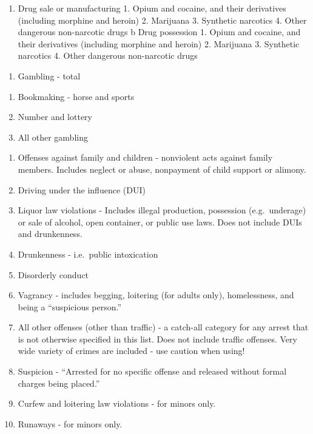 \documentclass[
]{krantz}
\providecommand{\tightlist}{%
  \setlength{\itemsep}{0pt}\setlength{\parskip}{0pt}}
\begin{document}
\begin{enumerate}
\def\labelenumi{\alph{enumi}.}
\tightlist
\item
  Drug sale or manufacturing 1. Opium and cocaine, and their
  derivatives (including morphine and heroin) 2. Marijuana
  3. Synthetic narcotics 4. Other dangerous non-narcotic
  drugs b Drug possession 1. Opium and cocaine, and their
  derivatives (including morphine and heroin) 2. Marijuana
  3. Synthetic narcotics 4. Other dangerous non-narcotic
  drugs
\end{enumerate}

\begin{enumerate}
\def\labelenumi{\arabic{enumi}.}
\setcounter{enumi}{18}
\tightlist
\item
  Gambling - total
\end{enumerate}

\begin{enumerate}
\def\labelenumi{\alph{enumi}.}
\tightlist
\item
  Bookmaking - horse and sports
\item
  Number and lottery
\item
  All other gambling
\end{enumerate}

\begin{enumerate}
\def\labelenumi{\arabic{enumi}.}
\setcounter{enumi}{19}
\tightlist
\item
  Offenses against family and children - nonviolent acts
  against family members. Includes neglect or abuse,
  nonpayment of child support or alimony.
\item
  Driving under the influence (DUI)
\item
  Liquor law violations - Includes illegal production,
  possession (e.g.~underage) or sale of alcohol, open
  container, or public use laws. Does not include DUIs and
  drunkenness.
\item
  Drunkenness - i.e.~public intoxication
\item
  Disorderly conduct
\item
  Vagrancy - includes begging, loitering (for adults only),
  homelessness, and being a ``suspicious person.''
\item
  All other offenses (other than traffic) - a catch-all
  category for any arrest that is not otherwise specified in
  this list. Does not include traffic offenses. Very wide
  variety of crimes are included - use caution when using!
\item
  Suspicion - ``Arrested for no specific offense and
  released without formal charges being placed.''
\item
  Curfew and loitering law violations - for minors only.
\item
  Runaways - for minors only.
\end{enumerate}
\end{document}
